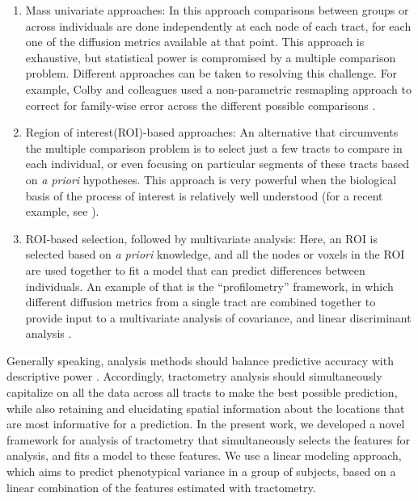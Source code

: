 \begin{enumerate}

\item Mass univariate approaches: In this approach comparisons between
groups or across individuals are done independently at each node
of each tract, for each one of the diffusion metrics available at
that point. This approach is exhaustive, but statistical power is
compromised by a multiple comparison problem. Different approaches
can be taken to resolving this challenge. For example, Colby and
colleagues \cite{colby2012} used a non-parametric resmapling approach to
correct for family-wise error across the different possible comparisons
\cite{Nichols2002-zu, Nichols2003-yy}.

\item Region of interest(ROI)-based approaches: An alternative that
circumvents the multiple comparison problem is to select just a few
tracts to compare in each individual, or even focusing on particular
segments of these tracts based on \emph{a priori} hypotheses. This
approach is very powerful when the biological basis of the process
of interest is relatively well understood (for a recent example, see
\cite{huber2018rapid}).

\item ROI-based selection, followed by multivariate analysis: Here,
an ROI is selected based on \emph{a priori} knowledge, and all the
nodes or voxels in the ROI are used together to fit a model that can
predict differences between individuals. An example of that is the
``profilometry'' framework, in which different diffusion metrics
from a single tract are combined together to provide input to a
multivariate analysis of covariance, and linear discriminant analysis
\cite{dayan2016profilometry}.

\end{enumerate}

Generally speaking, analysis methods should balance predictive
accuracy with descriptive power \cite{Murdoch2019-ax, Breiman2001-uz}.
Accordingly, tractometry analysis should simultaneously capitalize on
all the data across all tracts to make the best possible prediction,
while also retaining and elucidating spatial information about the
locations that are most informative for a prediction. In the present
work, we developed a novel framework for analysis of tractometry that
simultaneously selects the features for analysis, and fits a model
to these features. We use a linear modeling approach, which aims to
predict phenotypical variance in a group of subjects, based on a linear
combination of the features estimated with tractometry.

